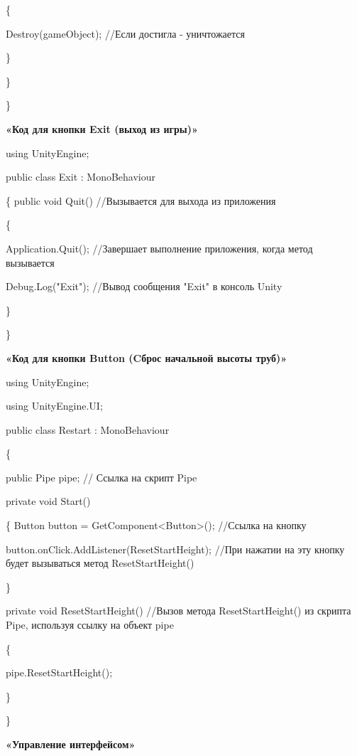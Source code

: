 \documentclass[14pt, oneside]{altsu-report}
\begin{document}
        \{
        
            Destroy(gameObject); //Если достигла - уничтожается
            
        \}
        
    \}

\}


\begin{center}
\label{code:appendix}\textbf{«Код для кнопки Exit (выход из игры)»} 
\end{center} 

using UnityEngine;

public class Exit : MonoBehaviour

\{
    public void Quit() //Вызывается для выхода из приложения
    
    \{
    
        Application.Quit(); //Завершает выполнение приложения, когда метод вызывается
        
        Debug.Log("Exit"); //Вывод сообщения "Exit" в консоль Unity
        
    \}
    
\}


\begin{center}
\label{code:appendix}\textbf{«Код для кнопки Button (Cброс начальной высоты труб)»} 
\end{center} 

using UnityEngine;

using UnityEngine.UI;

public class Restart : MonoBehaviour

\{

    public Pipe pipe; // Ссылка на скрипт Pipe

    private void Start()
    
    \{
        Button button = GetComponent<Button>(); //Ссылка на кнопку
        
        button.onClick.AddListener(ResetStartHeight); //При нажатии на эту кнопку будет вызываться метод ResetStartHeight()
    
    \}

    private void ResetStartHeight() //Вызов метода ResetStartHeight() из скрипта Pipe, используя ссылку на объект pipe
    
    \{
        
        pipe.ResetStartHeight();
    
    \}

\}

\begin{center}
\label{code:appendix}\textbf{«Управление интерфейсом»} 
\end{center} 
\end{document}
